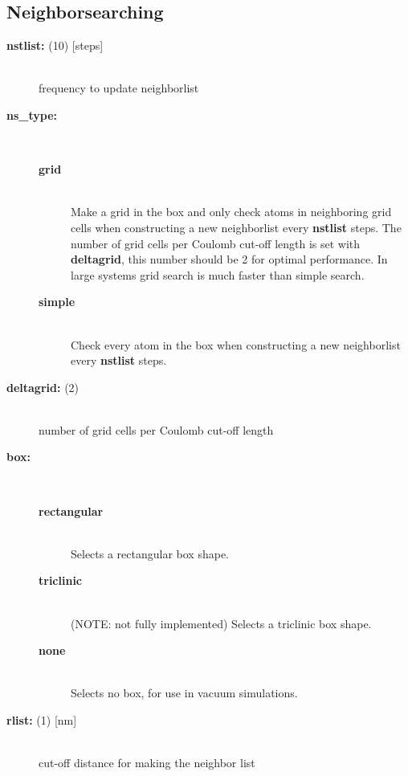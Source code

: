 \subsection{ Neighborsearching}
\begin{description}
\item[{\bf nstlist: }(10) {[steps]}]\mbox{}\\
frequency to update neighborlist
\item[{\bf ns\_type:}]\mbox{}\\
\vspace{-2ex}\begin{description}
\item[{\bf grid}]\mbox{}\\
Make a grid in the box and only check atoms in neighboring 
grid cells when constructing a new neighborlist every {\bf nstlist} steps. 
The number of grid cells per Coulomb cut-off length is set with 
{\bf deltagrid},
this number should be 2 for optimal performance.
In large systems grid search is much faster than simple search. 
\item[{\bf simple}]\mbox{}\\
Check every atom in the box when constructing a new neighborlist
every {\bf nstlist} steps.
\end{description}
\item[{\bf deltagrid: }(2)]\mbox{}\\
number of grid cells per Coulomb cut-off length
\item[{\bf box:}]\mbox{}\\
\vspace{-2ex}\begin{description}
\item[{\bf rectangular}]\mbox{}\\
Selects a rectangular box shape.
\item[{\bf triclinic}]\mbox{}\\
(NOTE: not fully implemented) Selects a triclinic box shape.
\item[{\bf none}]\mbox{}\\
Selects no box, for use in vacuum simulations.
\end{description}
\item[{\bf rlist: }(1) {[nm]}]\mbox{}\\
cut-off distance for making the neighbor list
\end{description}

